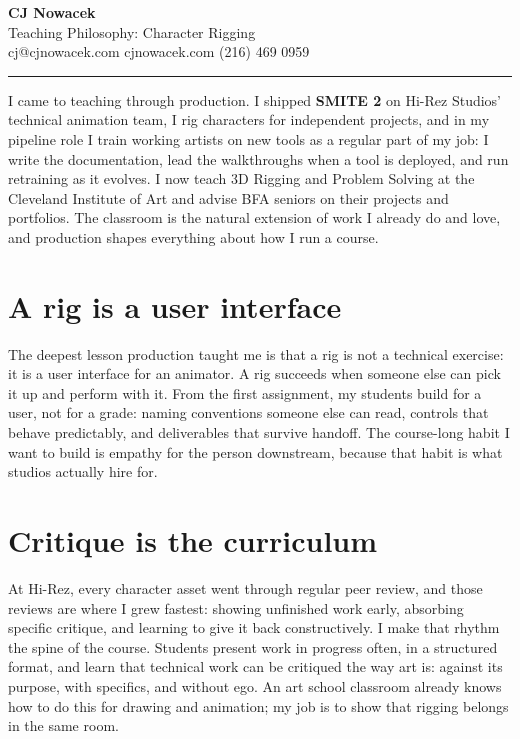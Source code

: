 \documentclass[10pt,a4paper]{article}
\begin{document}
{\huge\bfseries CJ Nowacek}\\[2pt]
{\large\color{accent} Teaching Philosophy: Character Rigging}\\[2pt]
{\small cj@cjnowacek.com \textbullet{} cjnowacek.com \textbullet{} (216) 469 0959}

\vspace{6pt}
\hrule
\vspace{4pt}

I came to teaching through production. I shipped \textbf{SMITE 2} on Hi-Rez Studios' technical animation team, I rig characters for independent projects, and in my pipeline role I train working artists on new tools as a regular part of my job: I write the documentation, lead the walkthroughs when a tool is deployed, and run retraining as it evolves. I now teach 3D Rigging and Problem Solving at the Cleveland Institute of Art and advise BFA seniors on their projects and portfolios. The classroom is the natural extension of work I already do and love, and production shapes everything about how I run a course.

\section{A rig is a user interface}
The deepest lesson production taught me is that a rig is not a technical exercise: it is a user interface for an animator. A rig succeeds when someone else can pick it up and perform with it. From the first assignment, my students build for a user, not for a grade: naming conventions someone else can read, controls that behave predictably, and deliverables that survive handoff. The course-long habit I want to build is empathy for the person downstream, because that habit is what studios actually hire for.

\section{Critique is the curriculum}
At Hi-Rez, every character asset went through regular peer review, and those reviews are where I grew fastest: showing unfinished work early, absorbing specific critique, and learning to give it back constructively. I make that rhythm the spine of the course. Students present work in progress often, in a structured format, and learn that technical work can be critiqued the way art is: against its purpose, with specifics, and without ego. An art school classroom already knows how to do this for drawing and animation; my job is to show that rigging belongs in the same room.
\end{document}
